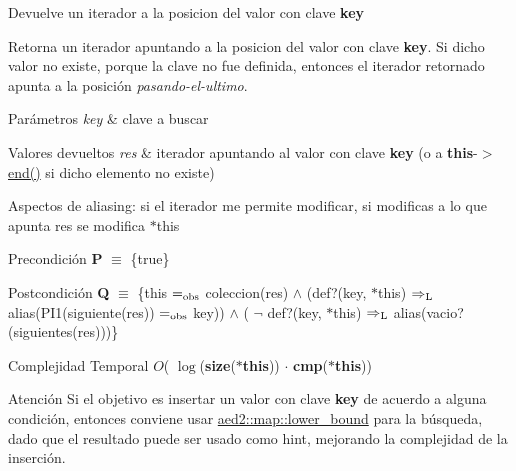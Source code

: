 Devuelve un iterador a la posicion del valor con clave {\bfseries key} 

Retorna un iterador apuntando a la posicion del valor con clave {\bfseries key}. Si dicho valor no existe, porque la clave no fue definida, entonces el iterador retornado apunta a la posición {\itshape pasando-\/el-\/ultimo}.


\begin{DoxyParams}{Parámetros}
{\em key} & clave a buscar \\
\hline
\end{DoxyParams}

\begin{DoxyRetVals}{Valores devueltos}
{\em res} & iterador apuntando al valor con clave {\bfseries key} (o a {\bfseries this}-\/$>$\hyperlink{classaed2_1_1map_a76023e6a56cb625513e1b5ea028bf983_a76023e6a56cb625513e1b5ea028bf983}{end()} si dicho elemento no existe)\\
\hline
\end{DoxyRetVals}
\begin{DoxyParagraph}{Aspectos de aliasing\+:}
si el iterador me permite modificar, si modificas a lo que apunta res se modifica $\ast$this
\end{DoxyParagraph}
\begin{DoxyPrecond}{Precondición}
{\bfseries P} $\equiv$ \{true\} 
\end{DoxyPrecond}
\begin{DoxyPostcond}{Postcondición}
{\bfseries Q} $\equiv$ \{this $=_{\rm obs}$ coleccion(res) $\land$ (def?(key, $\ast$this) $\Rightarrow_{\rm L}$ alias(P\+I1(siguiente(res)) $=_{\rm obs}$ key)) $\land$ ( $\lnot$ def?(key, $\ast$this) $\Rightarrow_{\rm L}$ alias(vacio?(siguientes(res)))\}
\end{DoxyPostcond}

\begin{DoxyDescription}
\item[Complejidad Temporal]$O$( $\log$({\bfseries size}({\bfseries $\ast$this})) $\cdot$ {\bfseries cmp}({\bfseries $\ast$this}))
\end{DoxyDescription}

\begin{DoxyAttention}{Atención}
Si el objetivo es insertar un valor con clave {\bfseries key} de acuerdo a alguna condición, entonces conviene usar \hyperlink{classaed2_1_1map_a3399d36fdd5a880b494f3a5795d3f18f_a3399d36fdd5a880b494f3a5795d3f18f}{aed2\+::map\+::lower\+\_\+bound} para la búsqueda, dado que el resultado puede ser usado como hint, mejorando la complejidad de la inserción. 
\end{DoxyAttention}


